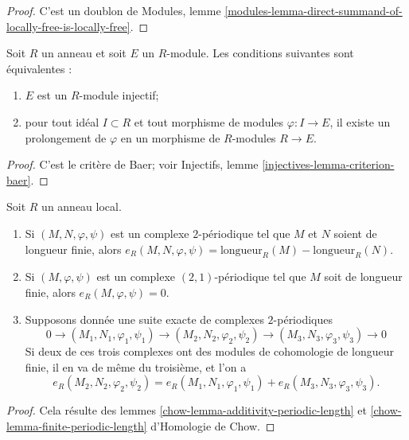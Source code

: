\begin{proof}
C'est un doublon de Modules, lemme
\ref{modules-lemma-direct-summand-of-locally-free-is-locally-free}.
\end{proof}

\begin{lemma}
\label{lemma-characterize-injective}
Soit $R$ un anneau et soit $E$ un $R$-module. Les conditions suivantes sont
équivalentes :
\begin{enumerate}
\item $E$ est un $R$-module injectif;
\item pour tout idéal $I \subset R$ et tout morphisme de modules
$\varphi : I \to E$, il existe un prolongement de $\varphi$ en un morphisme
de $R$-modules $R \to E$.
\end{enumerate}
\end{lemma}

\begin{proof}
C'est le critère de Baer; voir Injectifs, lemme
\ref{injectives-lemma-criterion-baer}.
\end{proof}

\begin{lemma}
\label{lemma-periodic-length}
Soit $R$ un anneau local.
\begin{enumerate}
\item Si $(M, N, \varphi, \psi)$ est un complexe $2$-périodique tel que
$M$ et $N$ soient de longueur finie, alors
$e_R(M, N, \varphi, \psi) = \text{longueur}_R(M) - \text{longueur}_R(N)$.
\item Si $(M, \varphi, \psi)$ est un complexe $(2, 1)$-périodique tel que
$M$ soit de longueur finie, alors
$e_R(M, \varphi, \psi) = 0$.
\item Supposons donnée une suite exacte de complexes $2$-périodiques
$$
0 \to (M_1, N_1, \varphi_1, \psi_1)
\to (M_2, N_2, \varphi_2, \psi_2)
\to (M_3, N_3, \varphi_3, \psi_3)
\to 0
$$
Si deux de ces trois complexes ont des modules de cohomologie de longueur
finie, il en va de même du troisième, et l'on a
$$
e_R(M_2, N_2, \varphi_2, \psi_2) =
e_R(M_1, N_1, \varphi_1, \psi_1) +
e_R(M_3, N_3, \varphi_3, \psi_3).
$$
\end{enumerate}
\end{lemma}

\begin{proof}
Cela résulte des lemmes \ref{chow-lemma-additivity-periodic-length} et
\ref{chow-lemma-finite-periodic-length} d'Homologie de Chow.
\end{proof}




